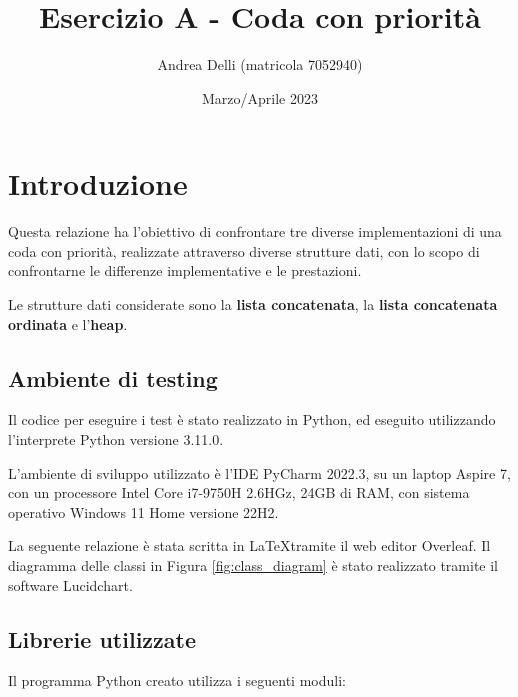 \documentclass{article}
\title{Esercizio A - Coda con priorità}
\author{Andrea Delli (matricola 7052940)}
\date{Marzo/Aprile 2023}
\begin{document}
\maketitle
\tableofcontents
\clearpage

\section{Introduzione}

Questa relazione ha l'obiettivo di confrontare tre diverse implementazioni di una coda con priorità, realizzate attraverso diverse strutture dati, con lo scopo di confrontarne le differenze implementative e le prestazioni.

\vspace{5pt}
Le strutture dati considerate sono la \textbf{lista concatenata}, la \textbf{lista concatenata ordinata} e l'\textbf{heap}.

\subsection{Ambiente di testing}

Il codice per eseguire i test è stato realizzato in Python, ed eseguito utilizzando l'interprete Python versione 3.11.0.

\vspace{5pt}
L'ambiente di sviluppo utilizzato è l'IDE PyCharm 2022.3, su un laptop Aspire 7, con un processore Intel Core i7-9750H 2.6HGz, 24GB di RAM, con sistema operativo Windows 11 Home versione 22H2.

\vspace{5pt}
La seguente relazione è stata scritta in \LaTeX tramite il web editor Overleaf. Il diagramma delle classi in Figura \ref{fig:class_diagram} è stato realizzato tramite il software Lucidchart.

\subsection{Librerie utilizzate}

Il programma Python creato utilizza i seguenti moduli:
\end{document}
